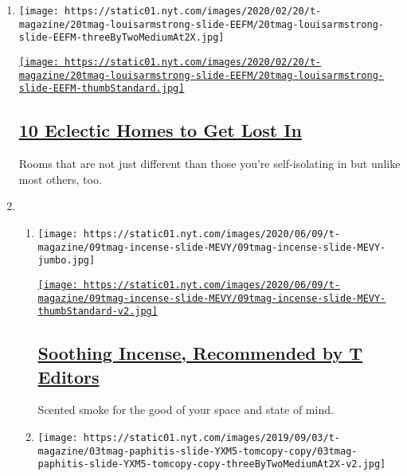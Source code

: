\begin{enumerate}
\def\labelenumi{\arabic{enumi}.}
\item
  \texttt{[image: https://static01.nyt.com/images/2020/02/20/t-magazine/20tmag-louisarmstrong-slide-EEFM/20tmag-louisarmstrong-slide-EEFM-threeByTwoMediumAt2X.jpg]}

  \href{/2020/05/08/t-magazine/house-tours-coronavirus-distraction.html}{\texttt{[image: https://static01.nyt.com/images/2020/02/20/t-magazine/20tmag-louisarmstrong-slide-EEFM/20tmag-louisarmstrong-slide-EEFM-thumbStandard.jpg]}}

  \hypertarget{10-eclectic-homes-to-get-lost-in}{%
  \subsection{\texorpdfstring{\href{/2020/05/08/t-magazine/house-tours-coronavirus-distraction.html}{10
  Eclectic Homes to Get Lost
  In}}{10 Eclectic Homes to Get Lost In}}\label{10-eclectic-homes-to-get-lost-in}}

  Rooms that are not just different than those you're self-isolating in
  but unlike most others, too.
\item
  \begin{enumerate}
  \def\labelenumii{\arabic{enumii}.}
  \item
    \texttt{[image: https://static01.nyt.com/images/2020/06/09/t-magazine/09tmag-incense-slide-MEVY/09tmag-incense-slide-MEVY-jumbo.jpg]}

    \href{/2020/06/09/t-magazine/best-incense.html}{\texttt{[image: https://static01.nyt.com/images/2020/06/09/t-magazine/09tmag-incense-slide-MEVY/09tmag-incense-slide-MEVY-thumbStandard-v2.jpg]}}

    \hypertarget{soothing-incense-recommended-by-t-editors}{%
    \subsection{\texorpdfstring{\href{/2020/06/09/t-magazine/best-incense.html}{Soothing
    Incense, Recommended by T
    Editors}}{Soothing Incense, Recommended by T Editors}}\label{soothing-incense-recommended-by-t-editors}}

    Scented smoke for the good of your space and state of mind.
  \item
    \texttt{[image: https://static01.nyt.com/images/2019/09/03/t-magazine/03tmag-paphitis-slide-YXM5-tomcopy-copy/03tmag-paphitis-slide-YXM5-tomcopy-copy-threeByTwoMediumAt2X-v2.jpg]}


\end{enumerate}
\end{enumerate}
